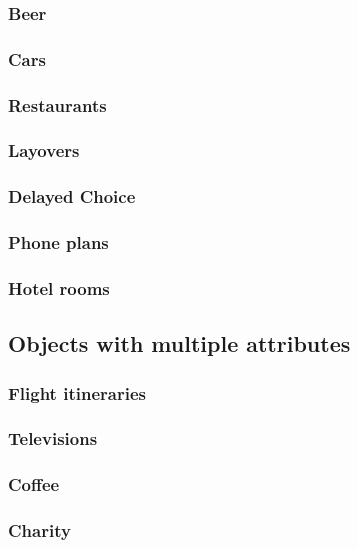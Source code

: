 \documentclass[11pt,letter]{article}
\begin{document}
\subsubsection{Beer}



\subsubsection{Cars}



\subsubsection{Restaurants}



\subsubsection{Layovers}



\subsubsection{Delayed Choice}



\subsubsection{Phone plans}



\subsubsection{Hotel rooms}



\subsection{Objects with multiple attributes}

\subsubsection{Flight itineraries}



\subsubsection{Televisions}



\subsubsection{Coffee}



\subsubsection{Charity}





\end{document}
